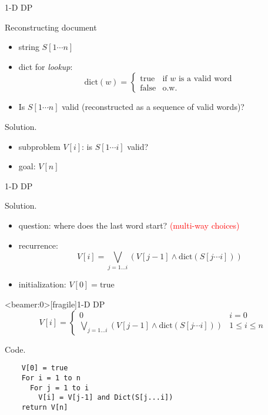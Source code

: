 \begin{frame}{1-D DP}
  \begin{exampleblock}{Reconstructing document }
    \begin{itemize}
      \item string $S[1 \cdots n]$
      \item dict for \emph{lookup}:
	\begin{displaymath}
	  \text{dict}(w) = \left\{ \begin{array}{ll}
	    \text{true} & \textrm{if } w \textrm{ is a valid word}\\
	    \text{false} & \textrm{o.w.}
	  \end{array} \right.
	\end{displaymath}
      \item Is $S[1 \cdots n]$ valid (reconstructed as a sequence of valid words)?
    \end{itemize}
  \end{exampleblock}

  \begin{block}{Solution.}
    \begin{itemize}
      \item subproblem $V[i]$: is $S[1 \cdots i]$ valid?
      \item goal: $V[n]$
    \end{itemize}
  \end{block}
\end{frame}
\begin{frame}{1-D DP}
  \begin{block}{Solution.}
    \begin{itemize}
      \item question: where does the last word start? {\footnotesize \textcolor{red}{(multi-way choices)}}
      \item recurrence: 
	\[ 
	  V[i] = \bigvee_{j = 1 \ldots i} (V[j-1] \land \text{dict}(S[j \cdots i]))
	\]
      \item initialization: $V[0] = \text{true}$
    \end{itemize}
  \end{block}
\end{frame}
\begin{frame}<beamer:0>[fragile]{1-D DP}
    \begin{displaymath}
      V[i] = \left\{ \begin{array}{ll}
	0 & i = 0 \\
	\bigvee_{j = 1 \ldots i} (V[j-1] \land \text{dict}(S[j \cdots i])) & 1 \le i \le n
      \end{array} \right.
    \end{displaymath}

  \begin{block}{Code.}
    \begin{verbatim}
    V[0] = true
    For i = 1 to n
      For j = 1 to i
        V[i] = V[j-1] and Dict(S[j...i])
    return V[n]
    \end{verbatim}
  \end{block}
\end{frame}
